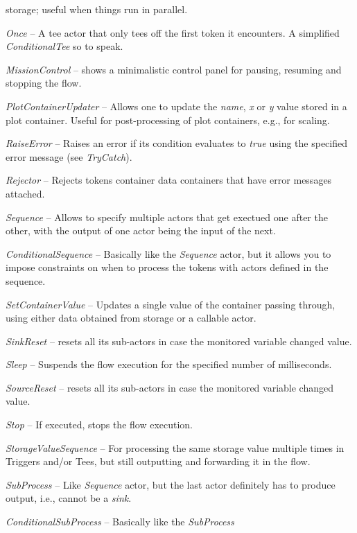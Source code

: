 \begin{tight_itemize}
	storage; useful when things run in parallel.
	\item \textit{Once} -- A tee actor that only tees off the first token it
	encounters. A simplified \textit{ConditionalTee} so to speak.
	\item \textit{MissionControl} -- shows a minimalistic control panel
	for pausing, resuming and stopping the flow.
	\item \textit{PlotContainerUpdater} -- Allows one to update the \textit{name},
	\textit{x} or \textit{y} value stored in a plot container. Useful for
	post-processing of plot containers, e.g., for scaling.
	\item \textit{RaiseError} -- Raises an error if its condition evaluates to
	\textit{true} using the specified error message (see \textit{TryCatch}).
	\item \textit{Rejector} -- Rejects tokens container data containers that have
	error messages attached.
	\item \textit{Sequence} -- Allows to specify multiple actors that get exectued
	one after the other, with the output of one actor being the input of the next.
	\item \textit{ConditionalSequence} -- Basically like the \textit{Sequence}
	actor, but it allows you to impose constraints on when to process the tokens
	with actors defined in the sequence.
	\item \textit{SetContainerValue} -- Updates a single value of the container
	passing through, using either data obtained from storage or a callable actor.
	\item \textit{SinkReset} -- resets all its sub-actors in case the monitored
	variable changed value.
	\item \textit{Sleep} -- Suspends the flow execution for the specified number of
	milliseconds.
	\item \textit{SourceReset} -- resets all its sub-actors in case the monitored
	variable changed value.
	\item \textit{Stop} -- If executed, stops the flow execution.
	\item \textit{StorageValueSequence} -- For processing the same storage value
	multiple times in Triggers and/or Tees, but still outputting and forwarding
	it in the flow.
	\item \textit{SubProcess} -- Like \textit{Sequence} actor, but the last actor
	definitely has to produce output, i.e., cannot be a \textit{sink}.
	\item \textit{ConditionalSubProcess} -- Basically like the \textit{SubProcess}

\end{tight_itemize}
